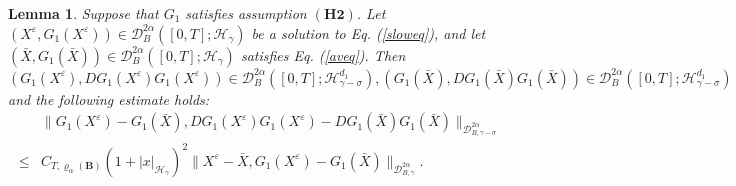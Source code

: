 \documentclass[10pt,a4paper]{article}
\newtheorem{lemma}{Lemma}[section]
\numberwithin{equation}{section}
\begin{document}
\begin{lemma}\label{Glem2}
Suppose that $G_1$ satisfies assumption $(\mathbf{H2})$.
Let $(X^\varepsilon,G_1(X^\varepsilon)) \in \mathcal{D}_{B}^{2\alpha}([0,T];\mathcal H_\gamma)$ be a solution to Eq. (\ref{sloweq}), and let $(\bar{X},G_1(\bar{X})) \in \mathcal{D}_{B}^{2\alpha}([0,T];\mathcal H_\gamma)$ satisfies Eq. (\ref{aveq}). Then $(G_1(X^\varepsilon),DG_1(X^\varepsilon)G_1(X^\varepsilon)) \in \mathcal{D}_{B}^{2\alpha}([0,T];\mathcal H_{\gamma-\sigma}^{d_1}), (G_1(\bar{X}),DG_1(\bar{X})G_1(\bar{X})) \in \mathcal{D}_{B}^{2\alpha}([0,T];\mathcal H_{\gamma-\sigma}^{d_1})$ and the following estimate holds:
\begin{align}\label{DGG}
	& \|G_1(X^\varepsilon)-G_1(\bar{X}),DG_1(X^\varepsilon)G_1(X^\varepsilon)-DG_1(\bar{X})G_1(\bar{X})\|_{\mathcal{D}_{B,\gamma-\sigma}^{2\alpha} }  \nonumber\\
	\leq & C_{T,\varrho_{\alpha}(\mathbf{B})} (1+|x|_{\mathcal H_\gamma})^2 \|X^\varepsilon-\bar{X},G_1(X^\varepsilon)-G_1(\bar{X}) \|_{\mathcal{D}_{B,\gamma}^{2\alpha}}.
\end{align}
\end{lemma}
\end{document}
